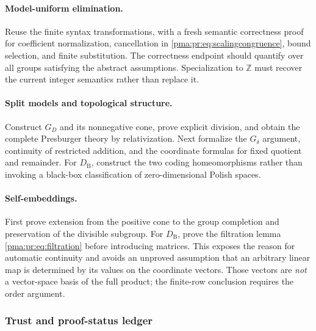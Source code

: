 \documentclass[11pt]{article}
\numberwithin{equation}{section}
\theoremstyle{definition}
\theoremstyle{remark}
\newcommand{\Z}{\mathbb Z}
\begin{document}
\paragraph{Model-uniform elimination.}
Reuse the finite syntax transformations, with a fresh semantic correctness
proof for coefficient normalization, cancellation in
\eqref{pma:pr:eq:scalingcongruence}, bound selection, and finite substitution.
The correctness endpoint should quantify over all groups satisfying the
abstract assumptions. Specialization to $\Z$ must recover the current
integer semantics rather than replace it.

\paragraph{Split models and topological structure.}
Construct $G_D$ and its nonnegative cone, prove explicit division, and
obtain the complete Presburger theory by relativization. Next formalize
the $G_\delta$ argument, continuity of restricted addition, and the
coordinate formulas for fixed quotient and remainder. For $D_{\mathrm B}$,
construct the two coding homeomorphisms rather than invoking a black-box
classification of zero-dimensional Polish spaces.

\paragraph{Self-embeddings.}
First prove extension from the positive cone to the group completion and
preservation of the divisible subgroup. For $D_{\mathrm B}$, prove the
filtration lemma \eqref{pma:pr:eq:filtration} before introducing matrices.
This exposes the reason for automatic continuity and avoids an unproved
assumption that an arbitrary linear map is determined by its values on
the coordinate vectors. Those vectors are \emph{not} a vector-space basis
of the full product; the finite-row conclusion requires the order argument.

\subsubsection{Trust and proof-status ledger}
\end{document}
